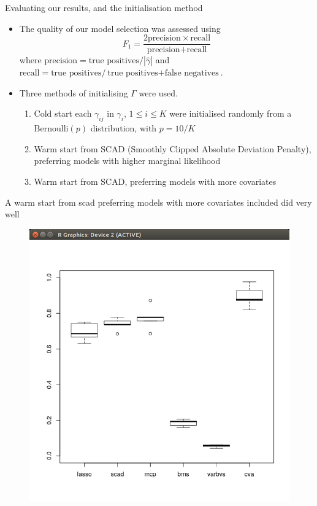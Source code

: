 \documentclass{beamer}
\begin{document}
\begin{frame}{Evaluating our results, and the initialisation method}
\begin{itemize}
\item
The quality of our model selection was assessed using
\[
	F_1 = \frac{2 \text{precision} \times \text{recall}}{\text{precision} + \text{recall}}
\]
where $\text{precision} = {\text{true positives}}/{|\hat{\gamma}|}$ and
$\text{recall} = {\text{true positives}}/{\text{true positives} + \text{false negatives}}$.

\item
Three methods of initialising $\Gamma$ were used.
\begin{enumerate}
\item Cold start each $\gamma_{ij}$ in $\gamma_i$, $1 \leq i \leq K$ were initialised randomly from a
$\text{Bernoulli}(p)$ distribution, with $p = 10 / K$
\item Warm start from SCAD (Smoothly Clipped Absolute Deviation Penalty), preferring models with higher marginal likelihood
\item Warm start from SCAD, preferring models with more covariates
\end{enumerate}
\end{itemize}
\end{frame}

\begin{frame}{A warm start from scad preferring models with more covariates included did very well}

\begin{figure}
\includegraphics[scale=0.33]{QLT_warm_start_covariates.png}
\end{figure}
\end{frame}
\end{document}
